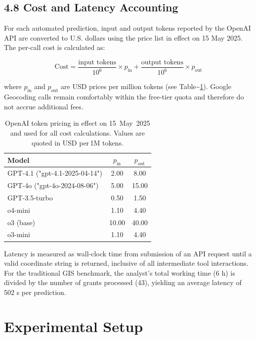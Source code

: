 \subsection{4.8 Cost and Latency
Accounting}\label{cost-and-latency-accounting}

For each automated prediction, input and output tokens reported by the
OpenAI API are converted to U.S. dollars using the price list in effect
on 15 May 2025. The per-call cost is calculated as:

\[
\text{Cost} = \frac{\text{input tokens}}{10^{6}} \times p_{\text{in}} + \frac{\text{output tokens}}{10^{6}} \times p_{\text{out}}
\]

where \(p_{\text{in}}\) and \(p_{\text{out}}\) are USD prices per
million tokens (see Table\textasciitilde{}\ref{tbl:prices}). Google
Geocoding calls remain comfortably within the free-tier quota and
therefore do not accrue additional fees.

\begin{table}[H]
\centering
\caption{OpenAI token pricing in effect on 15~May~2025 and used for all cost calculations.  Values are quoted in USD per\,1M tokens.}
\label{tbl:prices}
\begin{tabular}{lcc}
\toprule
Model & $p_{\text{in}}$ & $p_{\text{out}}$ \\
\midrule
GPT-4.1 ("gpt-4.1-2025-04-14") & 2.00 & 8.00 \\
GPT-4o ("gpt-4o-2024-08-06") & 5.00 & 15.00 \\
GPT-3.5-turbo & 0.50 & 1.50 \\
o4-mini & 1.10 & 4.40 \\
o3 (base) & 10.00 & 40.00 \\
o3-mini & 1.10 & 4.40 \\
\bottomrule
\end{tabular}
\end{table}

Latency is measured as wall-clock time from submission of an API request
until a valid coordinate string is returned, inclusive of all
intermediate tool interactions. For the traditional GIS benchmark, the
analyst's total working time (6 h) is divided by the number of grants
processed (43), yielding an average latency of 502 s per prediction.

\section{Experimental Setup}\label{experimental-setup}

